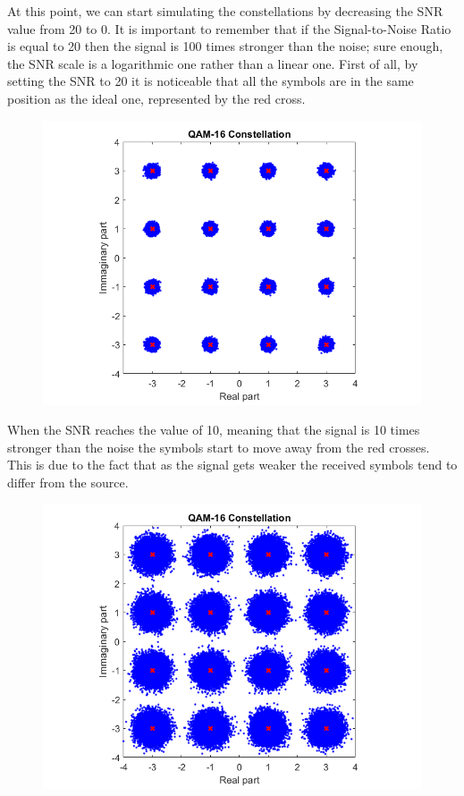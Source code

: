 \noindent At this point, we can start simulating the constellations by decreasing the SNR value from 20 to 0. It is important to remember that if the Signal-to-Noise Ratio is equal to 20 then the signal is 100 times stronger than the noise; sure enough, the SNR scale is a logarithmic one rather than a linear one. First of all, by setting the SNR to 20 it is noticeable that all the symbols are in the same position as the ideal one, represented by the red cross.

\begin{figure}[!h]
    \centering
    \includegraphics[width = .7\textwidth]{lab-6/imgs/SNR20.png}
\end{figure}
\vspace{-10px}

\noindent When the SNR reaches the value of 10, meaning that the signal is 10 times stronger than the noise the symbols start to move away from the red crosses. This is due to the fact that as the signal gets weaker the received symbols tend to differ from the source.

\begin{figure}[!h]
    \centering
    \includegraphics[width = .7\textwidth]{lab-6/imgs/SNR10.png}
\end{figure}
\vspace{-10px}

